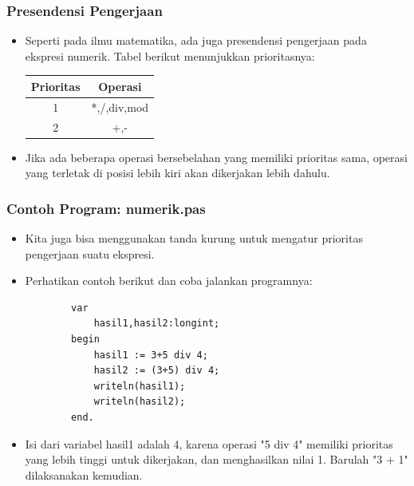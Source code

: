 \documentclass{beamer}
\begin{document}
\begin{frame}
\frametitle{Presendensi Pengerjaan}
\begin{itemize}
	\item Seperti pada ilmu matematika, ada juga presendensi pengerjaan pada ekspresi numerik. Tabel berikut menunjukkan prioritasnya:
	
	\begin{tabular}{|c|c|}
	\hline Prioritas & Operasi \\ 
	\hline 1 & *,/,div,mod \\ 
	\hline 2 & +,- \\ 
	\hline 
	\end{tabular} 
	\item Jika ada beberapa operasi bersebelahan yang memiliki prioritas sama, operasi yang terletak di posisi lebih kiri akan dikerjakan lebih dahulu.
\end{itemize}
\end{frame}

\begin{frame}[fragile]
\frametitle{Contoh Program: numerik.pas}
\begin{itemize}
	\item Kita juga bisa menggunakan tanda kurung untuk mengatur prioritas pengerjaan suatu ekspresi.
	\item Perhatikan contoh berikut dan coba jalankan programnya:
	\begin{lstlisting}
		var
		    hasil1,hasil2:longint;
		begin
		    hasil1 := 3+5 div 4;
		    hasil2 := (3+5) div 4;
		    writeln(hasil1);
		    writeln(hasil2);
		end.
	\end{lstlisting}
	\item Isi dari variabel hasil1 adalah 4, karena operasi "5 div 4" memiliki prioritas yang lebih tinggi untuk dikerjakan, dan menghasilkan nilai 1. Barulah "3 + 1" dilaksanakan kemudian. 
\end{itemize}
\end{frame}
\end{document}
